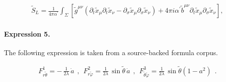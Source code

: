 \documentclass[11pt]{article}
\begin{document}
\begin{align*}\tilde{S}_L=\frac{1}{4\pi\alpha^\prime}\int_\Sigma[\tilde{g}^{\mu\nu }(\partial_t\tilde{x}_\mu \partial_t\tilde{x}_\nu-\partial_\sigma \tilde{x}_\mu \partial_\sigma \tilde{x}_\nu )+4\pi i\alpha^\prime \tilde{b}^{\mu\nu }\partial_t\tilde{x}_\mu\partial_\sigma \tilde{x}_\nu ],\end{align*}

\paragraph{Expression 5.} The following expression is taken from a source-backed formula corpus.

\begin{align*}F^{1}_{r {\tilde{\theta}}} = -\,\frac{1}{2\lambda}\,{\dot{a}}~~,~~ F^{2}_{r {\tilde{\varphi}}} = \frac{1}{2\lambda}\,{\sin{\widetilde{\theta}}\,{\dot{a}}}~~,~~ F^{3}_{{\tilde{\theta}}{\tilde{\varphi}}} = \frac{1}{2\lambda}\,{\sin{\widetilde{\theta}}}\left(1 - a^2 \right)~~. \end{align*}
\end{document}
